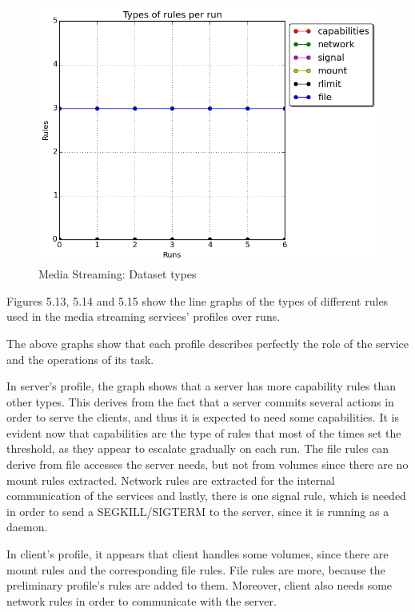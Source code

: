 \hfill\break\hfill\break\hfill\break\hfill\break\hfill\break\hfill\break\hfill\break\hfill\break\hfill\break\hfill\break\hfill\break\hfill\break\hfill\break\hfill\break\hfill\break\hfill\break\hfill\break\hfill\break

\begin{figure}[h!]
  \centering
   \includegraphics[width=0.7\linewidth]{figures/mediastreaming/types_cloudsuitemedia-streamingdataset.png}
   \caption{Media Streaming: Dataset types}
\end{figure}

Figures 5.13, 5.14 and 5.15 show the line graphs of the types of different rules used in the media streaming services' profiles over runs. 

The above graphs show that each profile describes perfectly the role of the service and the operations of its task.

In server's profile, the graph shows that a server has more capability rules than other types. This derives from the fact that a server commits several actions in order to serve the clients, and thus it is expected to need some capabilities. It is evident now that capabilities are the type of rules that most of the times set the threshold, as they appear to escalate gradually on each run. The file rules can derive from file accesses the server needs, but not from volumes since there are no mount rules extracted. Network rules are extracted for the internal communication of the services and lastly, there is one signal rule, which is needed in order to send a SEGKILL/SIGTERM to the server, since it is running as a daemon.

In client's profile, it appears that client handles some volumes, since there are mount rules and the corresponding file rules. File rules are more, because the preliminary profile's rules are added to them. Moreover, client also needs some network rules in order to communicate with the server.

